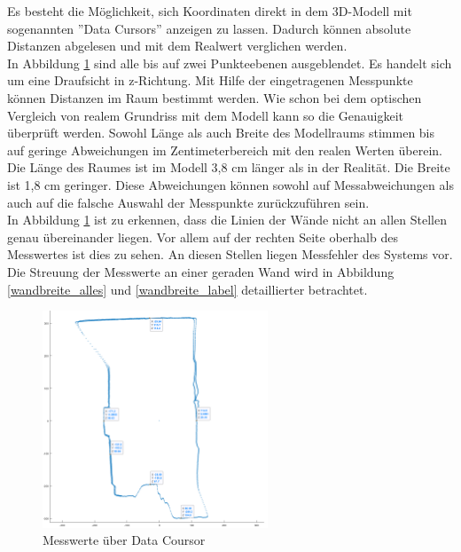Es besteht die Möglichkeit, sich Koordinaten direkt in dem 3D-Modell mit sogenannten ''Data Cursors'' anzeigen zu lassen. Dadurch können absolute Distanzen abgelesen und mit dem Realwert verglichen werden.\\
In Abbildung \ref{messwerte} sind alle bis auf zwei Punkteebenen ausgeblendet. Es handelt sich um eine Draufsicht in z-Richtung. Mit Hilfe der eingetragenen Messpunkte können Distanzen im Raum bestimmt werden. Wie schon bei dem optischen Vergleich von realem Grundriss mit dem Modell kann so die Genauigkeit überprüft werden. Sowohl Länge als auch Breite des Modellraums stimmen bis auf geringe Abweichungen im Zentimeterbereich mit den realen Werten überein. Die Länge des Raumes ist im Modell 3,8 cm länger als in der Realität. Die Breite ist 1,8 cm geringer. Diese Abweichungen können sowohl auf Messabweichungen als auch auf die falsche Auswahl der Messpunkte zurückzuführen sein. \\
In Abbildung \ref{messwerte} ist zu erkennen, dass die Linien der Wände nicht an allen Stellen genau übereinander liegen. Vor allem auf der rechten Seite oberhalb des Messwertes ist dies zu sehen. An diesen Stellen liegen Messfehler des Systems vor. Die Streuung der Messwerte an einer geraden Wand wird in Abbildung \ref{wandbreite_alles} und \ref{wandbreite_label} detaillierter betrachtet.

\begin{figure}[H]
	\centering
	\includegraphics[width=0.6\textwidth]{images/Validierung/Genauigkeit/Messwerte.png}
	\caption{Messwerte über Data Coursor}
	\label{messwerte}
\end{figure}

